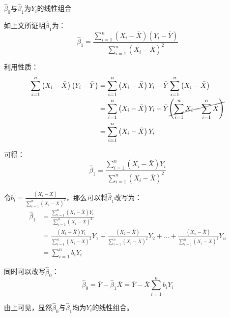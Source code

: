 \documentclass[11pt]{article}
\begin{document}
\begin{property}
    $\hat{\beta}_0$与$\hat{\beta}_1$为$Y_i$的线性组合

    如上文所证明$\hat{\beta}_1$为：
    \begin{equation*}
        \hat{\beta}_1 = \frac{\sum_{i=1}^{n} \left(X_i - \bar{X}\right) \left(Y_i - \bar{Y}\right)}{\sum_{i=1}^{n} \left(X_i - \bar{X}\right)^2}
    \end{equation*}

    利用性质：
    \begin{align*}
        \sum_{i=1}^{n} \left(X_i - \bar{X}\right) \left(Y_i - \bar{Y}\right)
        &= \sum_{i=1}^{n} \left( X_i - \bar{X} \right) Y_i - \bar{Y} \sum_{i=1}^{n} \left( X_i - \bar{X} \right) \\
        &= \sum_{i=1}^{n} \left( X_i - \bar{X} \right) Y_i - \bar{Y} \cancel{\left(\sum_{i=1}^{n} X_i - \sum_{i=1}^{n} \bar{X}\right)} \\
        &= \sum_{i=1}^{n} \left( X_i - \bar{X} \right) Y_i
    \end{align*}

    可得：
    \begin{equation*}
        \hat{\beta}_1 = \frac{\sum_{i=1}^{n} \left(X_i - \bar{X}\right) Y_i}{\sum_{i=1}^{n} \left(X_i - \bar{X}\right)^2}
    \end{equation*}

    令$b_i = \frac{\left(X_i - \bar{X}\right)}{\sum_{i=1}^{n} \left(X_i - \bar{X}\right)^2}$，那么可以将$\hat{\beta}_1$改写为：
    \begin{align*}
        \hat{\beta}_1 &= \frac{\sum_{i=1}^{n} \left(X_i - \bar{X}\right) Y_i}{\sum_{i=1}^{n} \left(X_i - \bar{X}\right)^2} \\
        &= \frac{(X_1 - \bar{X})Y_1}{\sum_{i=1}^{n} \left(X_i - \bar{X}\right)^2} Y_1 + \frac{(X_2 - \bar{X})}{\sum_{i=1}^{n} \left(X_i - \bar{X}\right)^2} Y_2 + \dots + \frac{(X_n - \bar{X})}{\sum_{i=1}^{n} \left(X_i - \bar{X}\right)^2} Y_n \\
        &= \sum_{i=1}^{n} b_i Y_i
    \end{align*}

    同时可以改写$\hat{\beta}_0$：
    \begin{equation*}
        \hat{\beta}_0 = \bar{Y} - \hat{\beta}_1 \bar{X}
        = \bar{Y} - \bar{X} \sum_{i=1}^{n} b_i Y_i
    \end{equation*}
    
    由上可见，显然$\hat{\beta}_0$与$\hat{\beta}_1$均为$Y_i$的线性组合。
\end{property}
\end{document}
